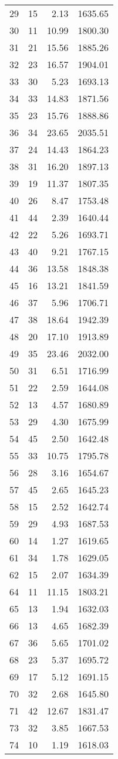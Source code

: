 \begin{appendix}
\begin{compacttable}
\begin{longtable}{@{}rrrr@{}}
29 & 15 & 2.13 & 1635.65 \\
30 & 11 & 10.99 & 1800.30 \\
31 & 21 & 15.56 & 1885.26 \\
32 & 23 & 16.57 & 1904.01 \\
33 & 30 & 5.23 & 1693.13 \\
34 & 33 & 14.83 & 1871.56 \\
35 & 23 & 15.76 & 1888.86 \\
36 & 34 & 23.65 & 2035.51 \\
37 & 24 & 14.43 & 1864.23 \\
38 & 31 & 16.20 & 1897.13 \\
39 & 19 & 11.37 & 1807.35 \\
40 & 26 & 8.47 & 1753.48 \\
41 & 44 & 2.39 & 1640.44 \\
42 & 22 & 5.26 & 1693.71 \\
43 & 40 & 9.21 & 1767.15 \\
44 & 36 & 13.58 & 1848.38 \\
45 & 16 & 13.21 & 1841.59 \\
46 & 37 & 5.96 & 1706.71 \\
47 & 38 & 18.64 & 1942.39 \\
48 & 20 & 17.10 & 1913.89 \\
49 & 35 & 23.46 & 2032.00 \\
50 & 31 & 6.51 & 1716.99 \\
51 & 22 & 2.59 & 1644.08 \\
52 & 13 & 4.57 & 1680.89 \\
53 & 29 & 4.30 & 1675.99 \\
54 & 45 & 2.50 & 1642.48 \\
55 & 33 & 10.75 & 1795.78 \\
56 & 28 & 3.16 & 1654.67 \\
57 & 45 & 2.65 & 1645.23 \\
58 & 15 & 2.52 & 1642.74 \\
59 & 29 & 4.93 & 1687.53 \\
60 & 14 & 1.27 & 1619.65 \\
61 & 34 & 1.78 & 1629.05 \\
62 & 15 & 2.07 & 1634.39 \\
64 & 11 & 11.15 & 1803.21 \\
65 & 13 & 1.94 & 1632.03 \\
66 & 13 & 4.65 & 1682.39 \\
67 & 36 & 5.65 & 1701.02 \\
68 & 23 & 5.37 & 1695.72 \\
69 & 17 & 5.12 & 1691.15 \\
70 & 32 & 2.68 & 1645.80 \\
71 & 42 & 12.67 & 1831.47 \\
73 & 32 & 3.85 & 1667.53 \\
74 & 10 & 1.19 & 1618.03 \\
\end{longtable}
\end{compacttable}


\end{appendix}
